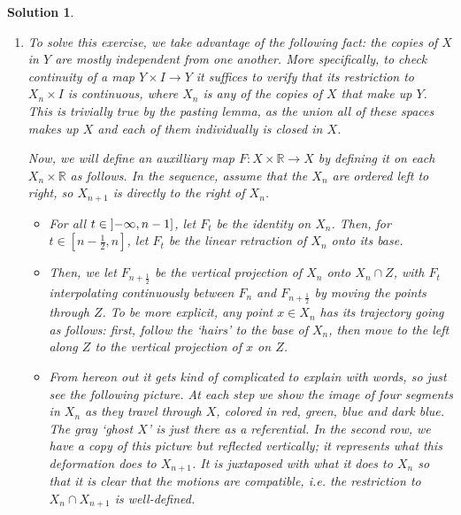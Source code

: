 \documentclass{article}
\theoremstyle{plain}
\theoremstyle{nonumberplain}
\newtheorem{sol}{Solution}
\newcommand{\R}{\mathbb{R}}
\begin{document}
\begin{sol}
\begin{enumerate}
Now, we claim that there is a retraction of $Y$ to this copy of $X$. It may be built explicitly as follows. Consider the infinite horizontal strip in which $Y$ is contained (actually the closure of $Y$). Within this strip, consider the triangle in which $X$ is contained (the closure of $X$). Then, there is a retraction of this rectangle onto this triangle, given by horizontal projection. Next, it suffices to show (and it is obvious) that this retraction, when restricted to $Y$, has image in $X$, and therefore is a retraction of $Y$ to $X$.

Now, if $Y$ deformation retracted to $p$, by composing this deformation with the retraction outlined in the previous paragraph, we would obtain a deformation retraction of $X$ to $p$, which contradicts (a). The proof of (this part of) (b) is complete.

\item To solve this exercise, we take advantage of the following fact: the copies of $X$ in $Y$ are mostly independent from one another. More specifically, to check continuity of a map $Y \times I \to Y$ it suffices to verify that its restriction to $X_n \times I$ is continuous, where $X_n$ is any of the copies of $X$ that make up $Y$. This is trivially true by the pasting lemma, as the union all of these spaces makes up $X$ and each of them individually is closed in $X$.

Now, we will define an auxilliary map $F \colon X \times \R \to X$ by defining it on each $X_n \times \R$ as follows. In the sequence, assume that the $X_n$ are ordered left to right, so $X_{n+1}$ is directly to the right of $X_n$.

\begin{itemize}
\item For all $t \in \linterval{-\infty}{n-1}$, let $F_t$ be the identity on $X_n$. Then, for $t \in [n-\frac12,n]$, let $F_t$ be the linear retraction of $X_n$ onto its base.

\item Then, we let $F_{n+\frac12}$ be the vertical projection of $X_n$ onto $X_n \cap Z$, with $F_t$ interpolating continuously between $F_n$ and $F_{n+\frac12}$ by moving the points through $Z$. To be more explicit, any point $x \in X_n$ has its trajectory going as follows: first, follow the `hairs' to the base of $X_n$, then move to the left along $Z$ to the vertical projection of $x$ on $Z$.

\item From hereon out it gets kind of complicated to explain with words, so just see the following picture. At each step we show the image of four segments in $X_n$ as they travel through $X$, colored in red, green, blue and dark blue. The gray `ghost $X$' is just there as a referential. In the second row, we have a copy of this picture but reflected vertically; it represents what this deformation does to $X_{n+1}$. It is juxtaposed with what it does to $X_n$ so that it is clear that the motions are compatible, i.e. the restriction to $X_n \cap X_{n+1}$ is well-defined.


\end{itemize}
\end{enumerate}
\end{sol}
\end{document}
